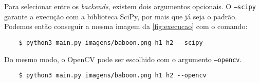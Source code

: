 Para selecionar entre os \textit{backends}, existem dois argumentos opcionais. O \texttt{--scipy} garante a execução com a biblioteca SciPy, por mais que já seja o padrão. Podemos então conseguir a mesma imagem da \cref{fig:execucao} com o comando:

\begin{verbatim}
    $ python3 main.py imagens/baboon.png h1 h2 --scipy
\end{verbatim}

Do mesmo modo, o OpenCV pode ser escolhido com o argumento \texttt{--opencv}.

\begin{verbatim}
    $ python3 main.py imagens/baboon.png h1 h2 --opencv
\end{verbatim}
